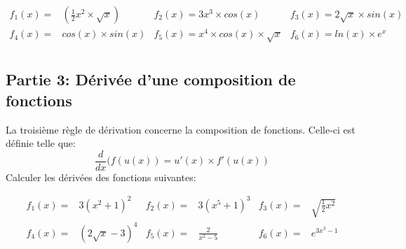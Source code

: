 \documentclass[11pt, french]{article}
\begin{document}
\begin{equation*}
\begin{matrix}
f_1(x) = & \left(\frac{1}{2}x^2 \times \sqrt{x}\right) & f_2(x) = 3x^3\times cos(x) & f_3(x) = 2\sqrt{x}\times sin(x)\\
f_4(x) = & cos(x)\times sin(x) & f_5(x) = x^4\times cos(x)\times \sqrt{x} & f_6(x) = ln(x)\times e^x\\
\end{matrix}
\end{equation*}

\subsection*{Partie 3: Dérivée d'une composition de fonctions}
La troisième règle de dérivation concerne la composition de fonctions. Celle-ci est définie telle que:
\begin{equation*}
\frac{d}{dx}(f(u(x)) = u'(x)\times f'(u(x)) 
\end{equation*}
Calculer les dérivées des fonctions suivantes:

\begin{equation*}
\begin{matrix}
f_1(x) = &  3\left(x^2 + 1\right)^2 & f_2(x) = & 3\left(x^5 + 1\right)^3 & f_3(x) = &\sqrt{\frac{1}{2}x^2}\\
f_4(x) = & (2\sqrt{x}- 3)^4 & f_5(x) = & \frac{2}{x^2-5} & f_6(x) = & e^{3x^3 -1}\\
\end{matrix}
\end{equation*}


\end{document}
